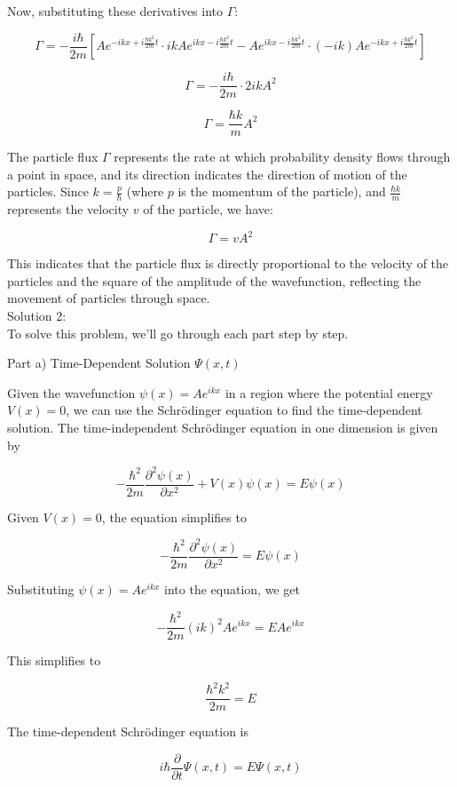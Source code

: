 \documentclass[a4paper,11pt]{article}
\begin{document}
Now, substituting these derivatives into \( \Gamma \):

\[ \Gamma = -\frac{i\hbar}{2m}\left[ Ae^{-ikx + i\frac{\hbar k^2}{2m}t} \cdot ikAe^{ikx - i\frac{\hbar k^2}{2m}t} - Ae^{ikx - i\frac{\hbar k^2}{2m}t} \cdot (-ik)Ae^{-ikx + i\frac{\hbar k^2}{2m}t} \right] \]

\[ \Gamma = -\frac{i\hbar}{2m} \cdot 2ikA^2 \]

\[ \Gamma = \frac{\hbar k}{m}A^2 \]

The particle flux \( \Gamma \) represents the rate at which probability density flows through a point in space, and its direction indicates the direction of motion of the particles. Since \( k = \frac{p}{\hbar} \) (where \( p \) is the momentum of the particle), and \( \frac{\hbar k}{m} \) represents the velocity \( v \) of the particle, we have:

\[ \Gamma = vA^2 \]

This indicates that the particle flux is directly proportional to the velocity of the particles and the square of the amplitude of the wavefunction, reflecting the movement of particles through space. \\

\noindent Solution 2: \\

To solve this problem, we'll go through each part step by step.

Part a) Time-Dependent Solution \( \Psi(x,t) \)

Given the wavefunction \( \psi(x) = Ae^{ikx} \) in a region where the potential energy \( V(x) = 0 \), we can use the Schrödinger equation to find the time-dependent solution. The time-independent Schrödinger equation in one dimension is given by

\[
-\frac{\hbar^2}{2m} \frac{\partial^2 \psi(x)}{\partial x^2} + V(x)\psi(x) = E\psi(x)
\]

Given \( V(x) = 0 \), the equation simplifies to

\[
-\frac{\hbar^2}{2m} \frac{\partial^2 \psi(x)}{\partial x^2} = E\psi(x)
\]

Substituting \( \psi(x) = Ae^{ikx} \) into the equation, we get

\[
-\frac{\hbar^2}{2m} (ik)^2 Ae^{ikx} = EAe^{ikx}
\]

This simplifies to

\[
\frac{\hbar^2k^2}{2m} = E
\]

The time-dependent Schrödinger equation is

\[
i\hbar \frac{\partial}{\partial t} \Psi(x,t) = E\Psi(x,t)
\]
\end{document}
